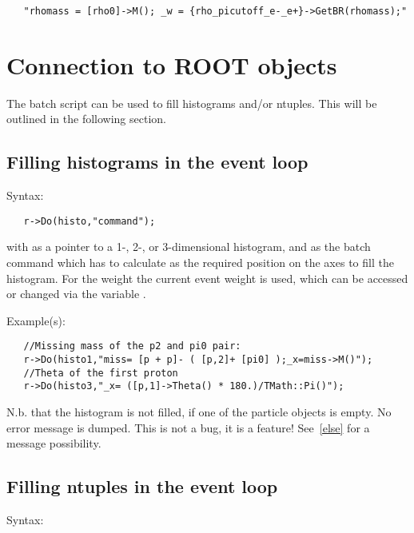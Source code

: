 {\begin{verbatim}
   "rhomass = [rho0]->M(); _w = {rho_picutoff_e-_e+}->GetBR(rhomass);"
\end{verbatim}



\section{Connection to ROOT objects}
\label{histos}


The batch script can be used to fill histograms and/or ntuples. This will
be outlined in the following section.

\subsection{Filling histograms in the event loop}

Syntax:

\begin{verbatim}
   r->Do(histo,"command"); 
\end{verbatim}

with  as a pointer to a 1-, 2-, or 3-dimensional histogram, and
 as the batch command which has to calculate  as the
required position on the axes to fill the histogram. 
For the weight the current event weight is used, which can be accessed or changed
via the variable  .

Example(s):

\begin{verbatim}
   //Missing mass of the p2 and pi0 pair:
   r->Do(histo1,"miss= [p + p]- ( [p,2]+ [pi0] );_x=miss->M()");
   //Theta of the first proton
   r->Do(histo3,"_x= ([p,1]->Theta() * 180.)/TMath::Pi()");
\end{verbatim}

N.b. that the histogram is not filled, if one of the particle objects
is empty. No error message is dumped. This is not a bug, it is a
feature! See~\ref{else} for a message possibility.


\subsection{Filling ntuples in the event loop}

Syntax:

}
